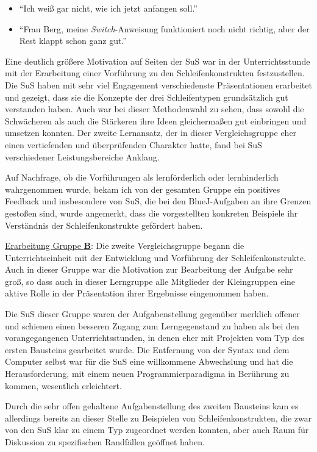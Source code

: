\documentclass[paper=a4, DIV=13, BCOR=12mm, twoside=on, onecolumn=on, open = any, titlepage =on, parskip =half-, headsepline = on, footsepline = on, chapterprefix = on, sectionprefix = on, appendixprefix = off, fontsize = 11pt, numbers = noenddot, abstract = off]{scrreprt}
\begin{document}
\singlespacing
\begin{itemize}
\item "`Ich weiß gar nicht, wie ich jetzt anfangen soll."'
\item "`Frau Berg, meine \emph{Switch}-Anweisung funktioniert noch nicht richtig, aber der Rest klappt schon ganz gut."'
\end{itemize}
\onehalfspacing

Eine deutlich größere Motivation auf Seiten der SuS war in der Unterrichtsstunde mit der Erarbeitung einer Vorführung zu den Schleifenkonstrukten festzustellen. Die SuS haben mit sehr viel Engagement verschiedenste Präsentationen erarbeitet und gezeigt, dass sie die Konzepte der drei Schleifentypen grundsätzlich gut verstanden haben. Auch war bei dieser Methodenwahl zu sehen, dass sowohl die Schwächeren als auch die Stärkeren ihre Ideen gleichermaßen gut einbringen und umsetzen konnten.
Der zweite Lernansatz, der in dieser Vergleichsgruppe eher einen vertiefenden und überprüfenden Charakter hatte, fand bei SuS verschiedener Leistungsbereiche Anklang.

Auf Nachfrage, ob die Vorführungen als lernförderlich oder lernhinderlich wahrgenommen wurde, bekam ich von der gesamten Gruppe ein positives Feedback und insbesondere von SuS, die bei den BlueJ-Aufgaben an ihre Grenzen gestoßen sind, wurde angemerkt, dass die vorgestellten konkreten Beispiele ihr Verständnis der Schleifenkonstrukte gefördert haben.


\underline{Erarbeitung Gruppe \textsc{\textbf{B}}}: Die zweite Vergleichsgruppe begann die Unterrichtseinheit mit der Entwicklung und Vorführung der Schleifenkonstrukte. Auch in dieser Gruppe war die Motivation zur Bearbeitung der Aufgabe sehr groß, so dass auch in dieser Lerngruppe alle Mitglieder der Kleingruppen eine aktive Rolle in der Präsentation ihrer Ergebnisse eingenommen haben. 

Die SuS dieser Gruppe waren der Aufgabenstellung gegenüber merklich offener und schienen einen besseren Zugang zum Lerngegenstand zu haben als bei den vorangegangenen Unterrichtsstunden, in denen eher mit Projekten vom Typ des ersten Bausteins gearbeitet wurde. Die Entfernung von der Syntax und dem Computer selbst war für die SuS eine willkommene Abwechslung und hat die Herausforderung, mit einem neuen Programmierparadigma in Berührung zu kommen, wesentlich erleichtert.

Durch die sehr offen gehaltene Aufgabenstellung des zweiten Bausteins kam es allerdings bereits an dieser Stelle zu Beispielen von Schleifenkonstrukten, die zwar von den SuS klar zu einem Typ zugeordnet werden konnten, aber auch Raum für Diskussion zu spezifischen Randfällen geöffnet haben. 
\end{document}
